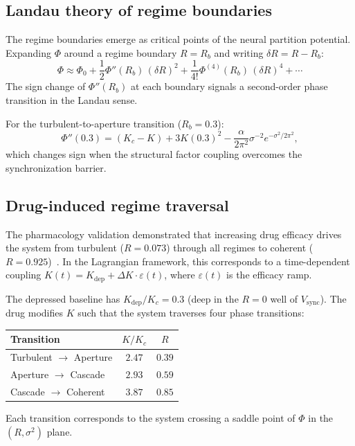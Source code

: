 \documentclass[twocolumn,aps,prl,superscriptaddress,floatfix]{revtex4-2}
\newcommand{\Pot}{\Phi}
\newcommand{\Kc}{K_c}
\begin{document}
\subsection{Landau theory of regime boundaries}

The regime boundaries emerge as critical points of the neural partition potential.
Expanding $\Pot$ around a regime boundary $R = R_b$ and writing $\delta R = R - R_b$:
\begin{equation}
\Pot \approx \Pot_0 + \frac{1}{2}\Pot''(R_b)\,(\delta R)^2 + \frac{1}{4!}\Pot^{(4)}(R_b)\,(\delta R)^4 + \cdots
\end{equation}
The sign change of $\Pot''(R_b)$ at each boundary signals a second-order phase transition in the Landau sense.

For the turbulent-to-aperture transition ($R_b = 0.3$):
\begin{equation}
\Pot''(0.3) = (\Kc - K) + 3K(0.3)^2 - \frac{\alpha}{2\pi^2}\sigma^{-2}e^{-\sigma^2/2\pi^2},
\end{equation}
which changes sign when the structural factor coupling overcomes the synchronization barrier.

\subsection{Drug-induced regime traversal}

The pharmacology validation demonstrated that increasing drug efficacy drives the system from turbulent ($R = 0.073$) through all regimes to coherent ($R = 0.925$)~\cite{sachikonye2026aperture}.
In the Lagrangian framework, this corresponds to a time-dependent coupling $K(t) = K_{\mathrm{dep}} + \Delta K \cdot \varepsilon(t)$, where $\varepsilon(t)$ is the efficacy ramp.

The depressed baseline has $K_{\mathrm{dep}}/\Kc = 0.3$ (deep in the $R = 0$ well of $V_{\mathrm{sync}}$).
The drug modifies $K$ such that the system traverses four phase transitions:
\begin{center}
\begin{tabular}{lcc}
\toprule
Transition & $K/\Kc$ & $R$ \\
\midrule
Turbulent $\to$ Aperture & $2.47$ & $0.39$ \\
Aperture $\to$ Cascade & $2.93$ & $0.59$ \\
Cascade $\to$ Coherent & $3.87$ & $0.85$ \\
\bottomrule
\end{tabular}
\end{center}
Each transition corresponds to the system crossing a saddle point of $\Pot$ in the $(R, \sigma^2)$ plane.
\end{document}
